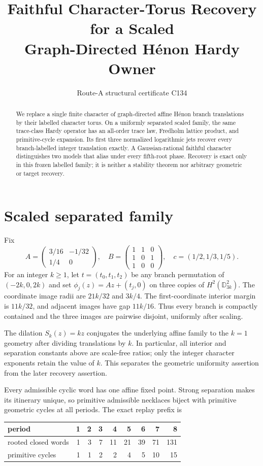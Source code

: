 \documentclass[10pt]{article}
\title{Faithful Character-Torus Recovery for a Scaled\\
Graph-Directed H\'enon Hardy Owner}
\author{Route-A structural certificate C134}
\date{}
\begin{document}
\maketitle
\begin{abstract}
We replace a single finite character of graph-directed affine H\'enon branch
translations by their labelled character torus.  On a uniformly separated
scaled family, the same trace-class Hardy operator has an all-order trace law,
Fredholm lattice product, and primitive-cycle expansion.  Its first three
normalized logarithmic jets recover every branch-labelled integer translation
exactly.  A Gaussian-rational faithful character distinguishes two models
that alias under every fifth-root phase.  Recovery is exact only in this
frozen labelled family; it is neither a stability theorem nor arbitrary
geometric or target recovery.
\end{abstract}

\section{Scaled separated family}
Fix
\[
A=\begin{pmatrix}3/16&-1/32\\1/4&0\end{pmatrix},\quad
B=\begin{pmatrix}1&1&0\\1&0&1\\1&0&0\end{pmatrix},\quad
c=(1/2,1/3,1/5).
\]
For an integer $k\geq1$, let $t=(t_0,t_1,t_2)$ be any branch permutation of
$(-2k,0,2k)$ and set $\phi_j(z)=Az+(t_j,0)$ on three copies of
$H^2(\mathbb D_{3k}^2)$.  The coordinate image radii are $21k/32$ and
$3k/4$.  The first-coordinate interior margin is $11k/32$, and adjacent
images have gap $11k/16$.  Thus every branch is compactly contained and the
three images are pairwise disjoint, uniformly after scaling.

The dilation $S_k(z)=kz$ conjugates the underlying affine family to the
$k=1$ geometry after dividing translations by $k$.  In particular, all
interior and separation constants above are scale-free ratios; only the
integer character exponents retain the value of $k$.  This separates the
geometric uniformity assertion from the later recovery assertion.

Every admissible cyclic word has one affine fixed point.  Strong separation
makes its itinerary unique, so primitive admissible necklaces biject with
primitive geometric cycles at all periods.  The exact replay prefix is
\begin{center}
\begin{tabular}{@{}lrrrrrrrr@{}}
\toprule
period &1&2&3&4&5&6&7&8\\
\midrule
rooted closed words &1&3&7&11&21&39&71&131\\
primitive cycles &1&1&2&2&4&5&10&15\\
\bottomrule
\end{tabular}
\end{center}
\end{document}
